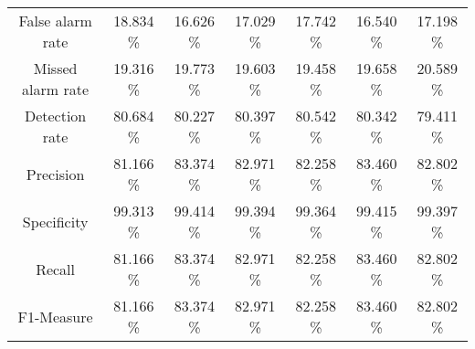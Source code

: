 \begin{table}[htb]
\begin{tabular}{@{}ccccccc@{}}
        False alarm rate &  18.834 \% &  16.626 \% &  17.029 \% &  17.742 \% &  16.540 \% &  17.198 \% \\
        Missed alarm rate &  19.316 \% &  19.773 \% &  19.603 \% &  19.458 \% &  19.658 \% &  20.589 \% \\
        Detection rate &  80.684 \% &  80.227 \% &  80.397 \% &  80.542 \% &  80.342 \% &  79.411 \% \\
        Precision &  81.166 \% &  83.374 \% &  82.971 \% &  82.258 \% &  83.460 \% &  82.802 \% \\
        Specificity &  99.313 \% &  99.414 \% &  99.394 \% &  99.364 \% &  99.415 \% &  99.397 \% \\
        Recall &  81.166 \% &  83.374 \% &  82.971 \% &  82.258 \% &  83.460 \% &  82.802 \% \\
        F1-Measure &  81.166 \% &  83.374 \% &  82.971 \% &  82.258 \% &  83.460 \% &  82.802 \% \\
        \bottomrule
    \end{tabular}
\end{table}
